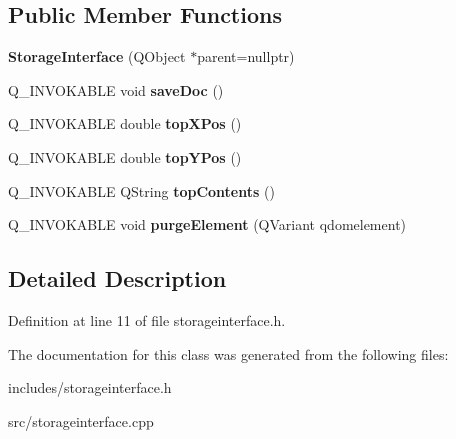 \subsection*{Public Member Functions}
\begin{DoxyCompactItemize}
\item 
\mbox{\label{classStorageInterface_a7586bb58eb326e9746e56762dc1e274e}} 
{\bfseries Storage\+Interface} (Q\+Object $\ast$parent=nullptr)
\item 
\mbox{\label{classStorageInterface_ad603f4c3282cbf80bbf4bba5fbd27ad3}} 
Q\+\_\+\+I\+N\+V\+O\+K\+A\+B\+LE void {\bfseries save\+Doc} ()
\item 
\mbox{\label{classStorageInterface_a51d75b4fdc7fdf2cbbe4c6c8e9963531}} 
Q\+\_\+\+I\+N\+V\+O\+K\+A\+B\+LE double {\bfseries top\+X\+Pos} ()
\item 
\mbox{\label{classStorageInterface_a101e97200cce19b0171255139ddc347c}} 
Q\+\_\+\+I\+N\+V\+O\+K\+A\+B\+LE double {\bfseries top\+Y\+Pos} ()
\item 
\mbox{\label{classStorageInterface_ad41bc8b449de097657e361762cc38ba2}} 
Q\+\_\+\+I\+N\+V\+O\+K\+A\+B\+LE Q\+String {\bfseries top\+Contents} ()
\item 
\mbox{\label{classStorageInterface_a0688904dc97ecb5f1693633744e7d065}} 
Q\+\_\+\+I\+N\+V\+O\+K\+A\+B\+LE void {\bfseries purge\+Element} (Q\+Variant qdomelement)
\end{DoxyCompactItemize}


\subsection{Detailed Description}


Definition at line 11 of file storageinterface.\+h.



The documentation for this class was generated from the following files\+:\begin{DoxyCompactItemize}
\item 
includes/storageinterface.\+h\item 
src/storageinterface.\+cpp\end{DoxyCompactItemize}
